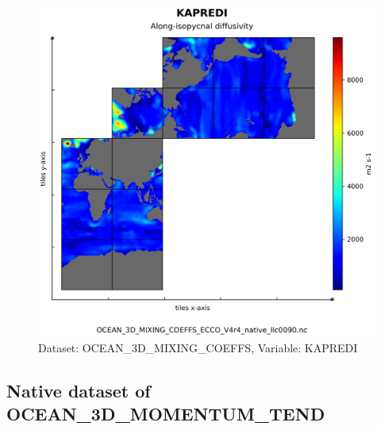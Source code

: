 \begin{figure}[H]
\centering
\includegraphics[scale=0.55]{../images/plots/native_plots/Ocean_3D_Gent-Mcwilliams_Redi_and_Background_Vertical_Diffusivity_Coefficients_for_the_Lat-Lon-Cap_90_(llc90)_Native_Model_Grid_(Version_4_Release_4)/KAPREDI.png}
\caption{Dataset: OCEAN\_3D\_MIXING\_COEFFS, Variable: KAPREDI}
\label{tab:table-OCEAN_3D_MIXING_COEFFS_KAPREDI-Plot}
\end{figure}
\subsection{Native dataset of OCEAN\_3D\_MOMENTUM\_TEND}
\newp
